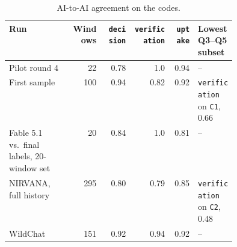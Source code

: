 \documentclass[manuscript,screen]{acmart}
\newcommand{\code}[1]{\texttt{#1}}
\begin{document}
\begin{table}[H]
\caption{AI-to-AI agreement on the codes.}
\label{tab:agreement}
\small
\begin{tabular}{p{0.27\linewidth}rrrrp{0.17\linewidth}}
\toprule
Run & Windows & \code{decision} & \code{verification} & \code{uptake} & Lowest Q3--Q5 subset \\
\midrule
Pilot round 4 & 22 & 0.78 & 1.0 & 0.94 & -- \\
First sample & 100 & 0.94 & 0.82 & 0.92 & \code{verification} on \code{C1}, 0.66 \\
Fable 5.1 vs.\ final labels, 20-window set & 20 & 0.84 & 1.0 & 0.81 & -- \\
NIRVANA, full history & 295 & 0.80 & 0.79 & 0.85 & \code{verification} on \code{C2}, 0.48 \\
WildChat & 151 & 0.92 & 0.94 & 0.92 & -- \\
\bottomrule
\end{tabular}
\end{table}
\end{document}
